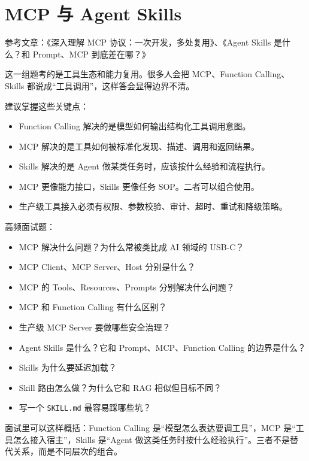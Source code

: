 \documentclass[9pt,a4paper,twocolumn]{ctexart}
\begin{document}
\section*{MCP 与 Agent Skills}


参考文章：《深入理解 MCP 协议：一次开发，多处复用》、《Agent Skills 是什么？和 Prompt、MCP 到底差在哪？》



这一组题考的是工具生态和能力复用。很多人会把 MCP、Function Calling、Skills 都说成“工具调用”，这样答会显得边界不清。



建议掌握这些关键点：


\begin{itemize}[itemsep=1pt, topsep=2pt]
  \item Function Calling 解决的是模型如何输出结构化工具调用意图。
  \item MCP 解决的是工具如何被标准化发现、描述、调用和返回结果。
  \item Skills 解决的是 Agent 做某类任务时，应该按什么经验和流程执行。
  \item MCP 更像能力接口，Skills 更像任务 SOP。二者可以组合使用。
  \item 生产级工具接入必须有权限、参数校验、审计、超时、重试和降级策略。
\end{itemize}


高频面试题：


\begin{itemize}[itemsep=1pt, topsep=2pt]
  \item MCP 解决什么问题？为什么常被类比成 AI 领域的 USB-C？
  \item MCP Client、MCP Server、Host 分别是什么？
  \item MCP 的 Tools、Resources、Prompts 分别解决什么问题？
  \item MCP 和 Function Calling 有什么区别？
  \item 生产级 MCP Server 要做哪些安全治理？
  \item Agent Skills 是什么？它和 Prompt、MCP、Function Calling 的边界是什么？
  \item Skills 为什么要延迟加载？
  \item Skill 路由怎么做？为什么它和 RAG 相似但目标不同？
  \item 写一个 \texttt{SKILL.md} 最容易踩哪些坑？
\end{itemize}


面试里可以这样概括：Function Calling 是“模型怎么表达要调工具”，MCP 是“工具怎么接入宿主”，Skills 是“Agent 做这类任务时按什么经验执行”。三者不是替代关系，而是不同层次的组合。
\end{document}
